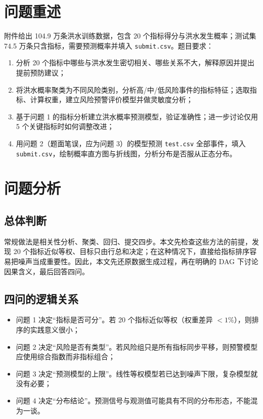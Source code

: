 \documentclass{article}
\begin{document}
\newpage

\section{问题重述}

附件给出 104.9 万条洪水训练数据，包含 20 个指标得分与洪水发生概率；测试集 74.5 万条只含指标，需要预测概率并填入 \texttt{submit.csv}。题目要求：

\begin{enumerate}[label=\textbf{问题 \arabic*}：]
  \item 分析 20 个指标中哪些与洪水发生密切相关、哪些关系不大，解释原因并提出提前预防建议；
  \item 将洪水概率聚类为不同风险类别，分析高/中/低风险事件的指标特征；选取指标、计算权重，建立风险预警评价模型并做灵敏度分析；
  \item 基于问题 1 的指标分析建立洪水概率预测模型，验证准确性；进一步讨论仅用 5 个关键指标时如何调整改进；
  \item 用问题 2（题面笔误，应为问题 3）的模型预测 \texttt{test.csv} 全部事件，填入 \texttt{submit.csv}，绘制概率直方图与折线图，分析分布是否服从正态分布。
\end{enumerate}

\section{问题分析}

\subsection{总体判断}
常规做法是相关性分析、聚类、回归、提交四步。本文先检查这些方法的前提，发现 20 个指标近似等权、目标只由行总和决定；在这种情况下，直接给指标排序容易把噪声当成重要性。因此，本文先还原数据生成过程，再在明确的 DAG 下讨论因果含义，最后回答四问。

\subsection{四问的逻辑关系}
\begin{itemize}
  \item 问题 1 决定“指标是否可分”。若 20 个指标近似等权（权重差异 $<1\%$），则排序的实践意义很小；
  \item 问题 2 决定“风险是否有类型”。若风险组只是所有指标同步平移，则预警模型应使用综合指数而非指标组合；
  \item 问题 3 决定“预测模型的上限”。线性等权模型若已达到噪声下限，复杂模型就没有必要；
  \item 问题 4 决定“分布结论”。预测信号与观测值可能具有不同的分布形态，不能混为一谈。
\end{itemize}
\end{document}
